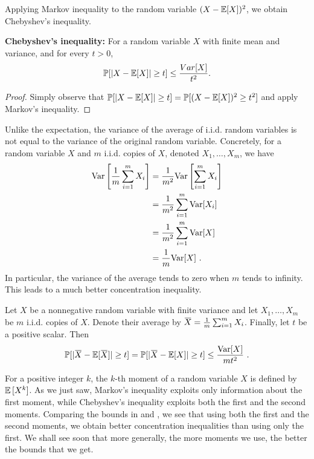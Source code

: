 \documentclass[11pt]{article}
\newcommand{\overbar}[1]{\mkern 1.5mu\overline{\mkern-1.5mu#1\mkern-1.5mu}\mkern 1.5mu}
\begin{document}
Applying Markov inequality to the random variable $(X-\mathbb{E}[X])^2$, we obtain Chebyshev's inequality.
\begin{theorem} \textbf{Chebyshev's inequality:} For a random variable
  $X$ with finite mean and variance, and for every $t  > 0$,
\[
\operatorname*{\mathbb{P}}[|X-\mathbb{E} [X]| \geq t] \leq \frac{Var[X]}{t^2}.
\]
\end{theorem}
\begin{proof}
Simply observe that $\operatorname*{\mathbb{P}}[|X-\mathbb{E} [X]| \geq t] = \operatorname*{\mathbb{P}}[(X-\mathbb{E} [X])^2 \geq t^2]$ and apply Markov's inequality.
\end{proof}
Unlike the expectation, the variance of the average of i.i.d. random variables is not equal to the variance of the original random variable. Concretely, for a random variable $X$ and $m$ i.i.d. copies of $X$, denoted $X_1,\ldots, X_m$, we have
\begin{align} \label{eq:varAve}
{\mathrm {Var}} \left[\frac{1}{m} \sum_{i=1} ^m X_i \right] &= \frac{1}{m^2} {\mathrm {Var}} \left[\sum_{i=1} ^m X_i \right] \notag \\&
= \frac{1}{m^2} \sum_{i=1} ^m {\mathrm {Var}} [X_i] \notag \\&
= \frac{1}{m^2} \sum_{i=1} ^m {\mathrm {Var}} [X] \notag \\&
= \frac{1}{m} {\mathrm {Var}}[X]~.
\end{align}
In particular, the variance of the average tends to zero when $m$ tends to infinity. This leads to a much better concentration inequality.
\begin{corollary} \label{cor:chebysevAve}
Let $X$ be a nonnegative random variable with finite variance and let $X_1,\ldots,X_m$ be $m$ i.i.d. copies of $X$. Denote their average by $\overbar{X}=\frac{1}{m} \sum_{i=1} ^m X_i$. Finally, let $t$ be a positive scalar. Then
\[
\prob [|\overbar{X}-\E [\overbar{X}]| \geq t] = \prob [|\overbar{X}-\E [X]| \geq t] \leq \frac{\rV[X]}{mt^2}~.
\]
\end{corollary}

For a positive integer $k$, the $k$-th moment of a random variable $X$ is defined by $\mathbb{E}\,[X^k]$. As we just saw, Markov's inequality exploits only information about the first moment, while Chebyshev's inequality exploits both the first and the second moments. Comparing the bounds in  and , we see that using both the first and the second moments, we obtain better concentration inequalities than using only the first. We shall see soon that more generally, the more moments we use, the better the bounds that we get.
\end{document}
